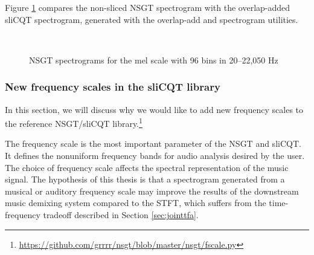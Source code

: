 \documentclass[report.tex]{subfiles}
\begin{document}
Figure \ref{fig:overlappedspectrograms} compares the non-sliced NSGT spectrogram with the overlap-added sliCQT spectrogram, generated with the overlap-add and spectrogram utilities.

\begin{figure}[ht]
	\centering
	\\
	\caption{NSGT spectrograms for the mel scale with 96 bins in 20--22,050 Hz}
	\label{fig:overlappedspectrograms}
\end{figure}

\subsubsection{New frequency scales in the sliCQT library}
\label{sec:improvelib}

In this section, we will discuss why we would like to add new frequency scales to the reference NSGT/sliCQT library.\footnote{\url{https://github.com/grrrr/nsgt/blob/master/nsgt/fscale.py}}

The frequency scale is the most important parameter of the NSGT and sliCQT. It defines the nonuniform frequency bands for audio analysis desired by the user. The choice of frequency scale affects the spectral representation of the music signal. The hypothesis of this thesis is that a spectrogram generated from a musical or auditory frequency scale may improve the results of the downstream music demixing system compared to the STFT, which suffers from the time-frequency tradeoff described in Section \ref{sec:jointtfa}.
\end{document}
